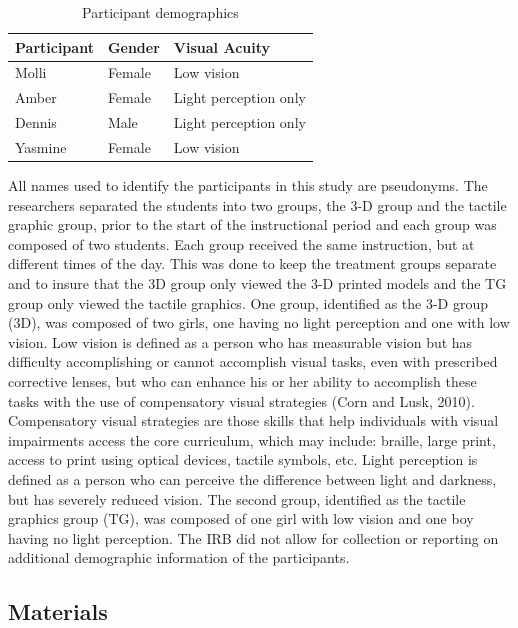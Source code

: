 \documentclass[11.5pt]{sig-alternate} %
\begin{document}
\begin{large}
\begin{table}[ht]
\caption{Participant demographics}
\begin{tabular}{lll}
\hline
\textbf{Participant} & \textbf{Gender} & \textbf{Visual Acuity} \\ \hline
Molli & Female & Low vision \\
Amber & Female & Light perception only \\
Dennis & Male & Light perception only \\
Yasmine & Female & Low vision \\ \hline
\end{tabular}
\end{table}
  
All names used to identify the participants in this study are pseudonyms.   The researchers separated the students into two groups, the 3-D group and the tactile graphic group, prior to the start of the instructional period and each group was composed of two students.  Each group received the same instruction, but at different times of the day.  This was done to keep the treatment groups separate and to insure that the 3D group only viewed the 3-D printed models and the TG group only viewed the tactile graphics.  One group, identified as the 3-D group (3D), was composed of two girls, one having no light perception and one with low vision.  Low vision is defined as a person who has measurable vision but has difficulty accomplishing or cannot accomplish visual tasks, even with prescribed corrective lenses, but who can enhance his or her ability to accomplish these tasks with the use of compensatory visual strategies (Corn and Lusk, 2010).  Compensatory visual strategies are those skills that help individuals with visual impairments access the core curriculum, which may include:  braille, large print, access to print using optical devices, tactile symbols, etc.  Light perception is defined as a person who can perceive the difference between light and darkness, but has severely reduced vision.  The second group, identified as the tactile graphics group (TG), was composed of one girl with low vision and one boy having no light perception.  The IRB did not allow for collection or reporting on additional demographic information of the participants.  

\subsection*{Materials}
  

\end{large}
\end{document}
